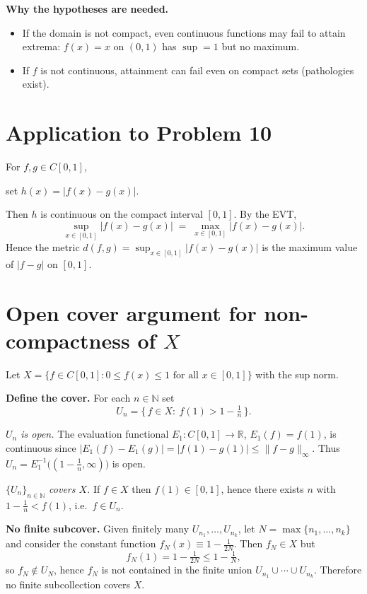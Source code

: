 \documentclass[12pt,a4paper]{article}
\theoremstyle{plain}
\theoremstyle{definition}
\theoremstyle{remark}
\theoremstyle{remark}
\begin{document}
\smallskip

\noindent\textbf{Why the hypotheses are needed.}
\begin{itemize}
	\item If the domain is not compact, even continuous functions may fail to attain extrema:
	$f(x)=x$ on $(0,1)$ has $\sup=1$ but no maximum.
	\item If $f$ is not continuous, attainment can fail even on compact sets (pathologies exist).
\end{itemize}

\bigskip

\section*{Application to Problem 10}

For $f,g\in C[0,1]$,

 set $h(x)=|f(x)-g(x)|$.

Then $h$ is continuous on the compact interval $[0,1]$.
By the EVT,
\[
\sup_{x\in[0,1]} |f(x)-g(x)| \;=\; \max_{x\in[0,1]} |f(x)-g(x)|.
\]
Hence the metric $d(f,g)=\sup_{x\in[0,1]}|f(x)-g(x)|$ is the maximum value of $|f-g|$ on $[0,1]$.


\section*{Open cover argument for non-compactness of $X$}

Let $X=\{f\in C[0,1]: 0\le f(x)\le 1 \text{ for all }x\in[0,1]\}$ with the sup norm.

\smallskip

\noindent\textbf{Define the cover.}
For each $n\in\mathbb{N}$ set
\[
U_n=\bigl\{\,f\in X:\ f(1)>1-\tfrac1n\,\bigr\}.
\]

\noindent\emph{$U_n$ is open.}
The evaluation functional $E_1:C[0,1]\to\mathbb{R}$, $E_1(f)=f(1)$, is continuous since
$|E_1(f)-E_1(g)|=|f(1)-g(1)|\le \|f-g\|_\infty$.
Thus $U_n=E_1^{-1}\bigl((1-\tfrac1n,\infty)\bigr)$ is open.

\smallskip

\noindent\emph{$\{U_n\}_{n\in\mathbb{N}}$ covers $X$.}
If $f\in X$ then $f(1)\in[0,1]$, hence there exists $n$ with $1-\tfrac1n<f(1)$, i.e.\ $f\in U_n$.

\smallskip

\noindent\textbf{No finite subcover.}
Given finitely many $U_{n_1},\dots,U_{n_k}$, let $N=\max\{n_1,\dots,n_k\}$ and consider
the constant function $f_N(x)\equiv 1-\tfrac{1}{2N}$.
Then $f_N\in X$ but
\[
f_N(1)=1-\tfrac{1}{2N}\le 1-\tfrac1N,
\]
so $f_N\notin U_N$, hence $f_N$ is not contained in the finite union $U_{n_1}\cup\cdots\cup U_{n_k}$.
Therefore no finite subcollection covers $X$.
\end{document}
